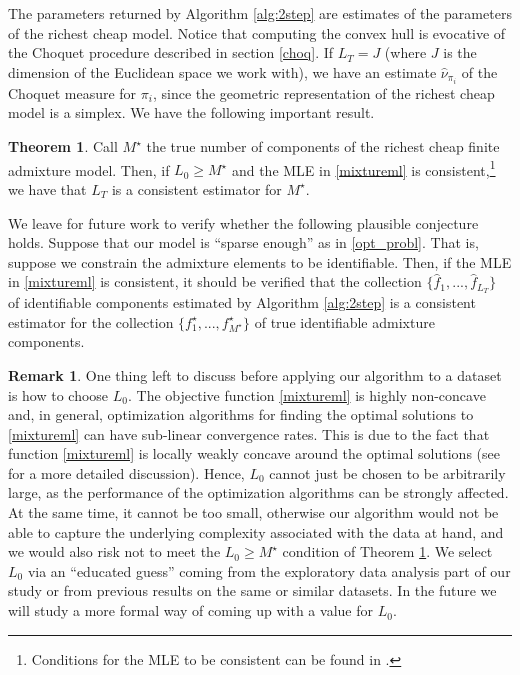 \documentclass[12pt, reqno]{amsart}
\theoremstyle{definition}
\newtheorem{theorem}{Theorem}%
\newtheorem{remark}{Remark}
\begin{document}
The parameters returned by Algorithm \ref{alg:2step} are estimates of the parameters of the richest cheap model. Notice that computing the convex hull is evocative of the Choquet procedure described in section \ref{choq}. If $L_T=J$ (where $J$ is the dimension of the Euclidean space we work with), we have an estimate $\hat{\nu}_{\pi_i}$ of the Choquet measure for $\pi_i$, since the geometric representation of the richest cheap model is a simplex. 
We have the following important result.

\begin{theorem}\label{algo_cons}
    Call $M^\star$ the true number of components of the richest cheap finite admixture model. Then, if $L_0 \geq M^\star$ and the MLE in \eqref{mixtureml} is consistent,\footnote{Conditions for the MLE to be consistent can be found in \cite{wasserman_2}.} we have that $L_T$ is a consistent estimator for $M^\star$.
\end{theorem}

We leave for future work to verify whether the following plausible conjecture holds. Suppose that our model is ``sparse enough'' as in \eqref{opt_probl}. That is, suppose we constrain the admixture elements to be identifiable. Then, if the MLE in \eqref{mixtureml} is consistent, it should be verified that the collection $\{\hat{f}_1,...,\hat{f}_{L_T}\}$ of identifiable components estimated by Algorithm \ref{alg:2step} is a consistent estimator for the collection  $\{{f}^\star_1,...,{f}^\star_{M^\star}\}$ of true identifiable admixture components.

\begin{remark}\label{rem_l0}
    One thing left to discuss before applying our algorithm to a dataset is how to choose $L_0$. The objective function \eqref{mixtureml} is highly non-concave and, in general, optimization algorithms
for finding the optimal solutions to \eqref{mixtureml} can have sub-linear convergence
rates. This is due to the fact that function \eqref{mixtureml} is locally weakly concave around
the optimal solutions (see \cite{dwivedi} for a more detailed discussion). Hence, $L_0$ cannot just be chosen to be arbitrarily large, as the performance of the optimization algorithms can be strongly
affected. At the same time, it cannot be too small, otherwise our algorithm would not be able to capture the underlying complexity associated with the data at hand, and we would also risk not to meet the $L_0 \geq M^\star$ condition of Theorem \ref{algo_cons}. We select $L_0$ via an ``educated guess'' coming from the exploratory data analysis part of our study or from previous results on the same or similar datasets. In the future we will study a more formal way of coming up with a value for $L_0$. 

\end{remark}
\end{document}
